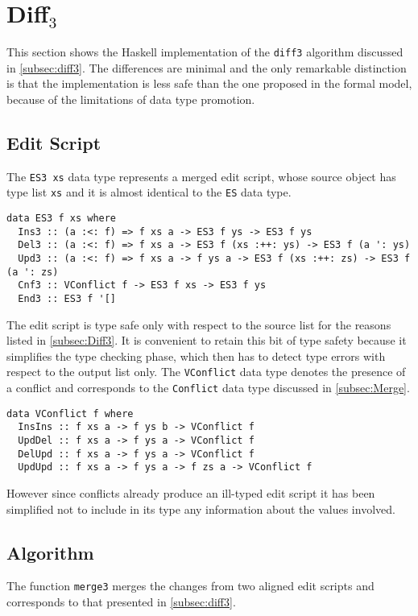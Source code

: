 \documentclass[../Thesis.tex]{subfiles}
\begin{document}
	\section{Diff$_3$}
	This section shows the Haskell implementation of the
	\texttt{diff3} algorithm discussed in \ref{subsec:diff3}.
	The differences are minimal and the only remarkable distinction
	is that the implementation is less safe than the one
	proposed in the formal model, because of the limitations
	of data type promotion.
	

	\subsection{Edit Script}
	\label{subsec:ES3}
	The \texttt{ES3 xs} data type represents a merged edit script,
	whose source object has type list \texttt{xs} and it
	is almost identical to the \texttt{ES} data type.
	
\begin{verbatim}
data ES3 f xs where
  Ins3 :: (a :<: f) => f xs a -> ES3 f ys -> ES3 f ys
  Del3 :: (a :<: f) => f xs a -> ES3 f (xs :++: ys) -> ES3 f (a ': ys) 
  Upd3 :: (a :<: f) => f xs a -> f ys a -> ES3 f (xs :++: zs) -> ES3 f (a ': zs) 
  Cnf3 :: VConflict f -> ES3 f xs -> ES3 f ys
  End3 :: ES3 f '[] 
\end{verbatim}

	The edit script is type safe only with respect
	to the source list for the reasons listed in \ref{subsec:Diff3}.	
	It is convenient to retain this bit of type safety because it 
	simplifies the type checking phase, which then has to detect type 
	errors with respect to the output list only.
	The \texttt{VConflict} data type denotes the presence
	of a conflict and corresponds to the \texttt{Conflict}
	data type discussed in \ref{subsec:Merge}.
\begin{verbatim}
data VConflict f where
  InsIns :: f xs a -> f ys b -> VConflict f
  UpdDel :: f xs a -> f ys a -> VConflict f
  DelUpd :: f xs a -> f ys a -> VConflict f
  UpdUpd :: f xs a -> f ys a -> f zs a -> VConflict f
\end{verbatim}

	However since conflicts already produce an ill-typed edit script
	it has been simplified not to include
	in its type any information about the values involved.
		
	\subsection{Algorithm}
	\label{subsec:Diff3Algo}
	The function \texttt{merge3} merges the changes from 
	two aligned edit scripts and corresponds to that presented
	in \ref{subsec:diff3}.
\end{document}

